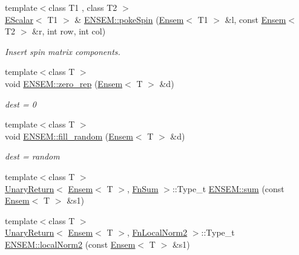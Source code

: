 \begin{DoxyCompactItemize}
{\footnotesize template$<$class T1 , class T2 $>$ }\\\mbox{\hyperlink{classENSEM_1_1EScalar}{E\+Scalar}}$<$ T1 $>$ \& \mbox{\hyperlink{group__eensem_ga21cbf6a127bd98e6cf1909afe3050089}{E\+N\+S\+E\+M\+::poke\+Spin}} (\mbox{\hyperlink{classENSEM_1_1Ensem}{Ensem}}$<$ T1 $>$ \&l, const \mbox{\hyperlink{classENSEM_1_1Ensem}{Ensem}}$<$ T2 $>$ \&r, int row, int col)
\begin{DoxyCompactList}\small\item\em Insert spin matrix components. \end{DoxyCompactList}\item 
{\footnotesize template$<$class T $>$ }\\void \mbox{\hyperlink{group__eensem_gafc79cdca8881b76b79874dce8e6a3816}{E\+N\+S\+E\+M\+::zero\+\_\+rep}} (\mbox{\hyperlink{classENSEM_1_1Ensem}{Ensem}}$<$ T $>$ \&d)
\begin{DoxyCompactList}\small\item\em dest = 0 \end{DoxyCompactList}\item 
{\footnotesize template$<$class T $>$ }\\void \mbox{\hyperlink{group__eensem_gaa016282cc53ea94b4fc28c2714c30294}{E\+N\+S\+E\+M\+::fill\+\_\+random}} (\mbox{\hyperlink{classENSEM_1_1Ensem}{Ensem}}$<$ T $>$ \&d)
\begin{DoxyCompactList}\small\item\em dest = random \end{DoxyCompactList}\item 
{\footnotesize template$<$class T $>$ }\\\mbox{\hyperlink{structENSEM_1_1UnaryReturn}{Unary\+Return}}$<$ \mbox{\hyperlink{classENSEM_1_1Ensem}{Ensem}}$<$ T $>$, \mbox{\hyperlink{structENSEM_1_1FnSum}{Fn\+Sum}} $>$\+::Type\+\_\+t \mbox{\hyperlink{group__eensem_gac055c3d3de5296fcc478482fc09633ce}{E\+N\+S\+E\+M\+::sum}} (const \mbox{\hyperlink{classENSEM_1_1Ensem}{Ensem}}$<$ T $>$ \&s1)
\item 
{\footnotesize template$<$class T $>$ }\\\mbox{\hyperlink{structENSEM_1_1UnaryReturn}{Unary\+Return}}$<$ \mbox{\hyperlink{classENSEM_1_1Ensem}{Ensem}}$<$ T $>$, \mbox{\hyperlink{structENSEM_1_1FnLocalNorm2}{Fn\+Local\+Norm2}} $>$\+::Type\+\_\+t \mbox{\hyperlink{group__eensem_gadea3947facb136bb23ca06c2e6e09400}{E\+N\+S\+E\+M\+::local\+Norm2}} (const \mbox{\hyperlink{classENSEM_1_1Ensem}{Ensem}}$<$ T $>$ \&s1)
\item 

\end{DoxyCompactItemize}
